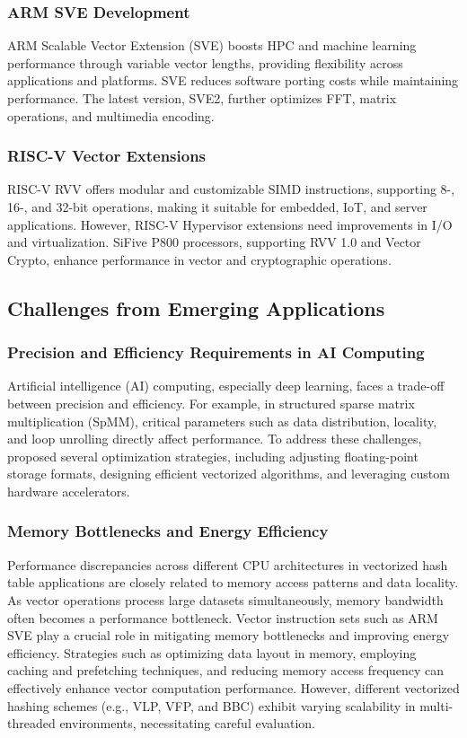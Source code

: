 \documentclass[conference]{IEEEtran}
\begin{document}
\subsubsection{ARM SVE Development\cite{b22}}
ARM Scalable Vector Extension (SVE) boosts HPC and machine learning performance through variable vector lengths, providing flexibility across applications and platforms. SVE reduces software porting costs while maintaining performance. The latest version, SVE2, further optimizes FFT, matrix operations, and multimedia encoding.

\subsubsection{RISC-V Vector Extensions \cite{b17}} RISC-V RVV offers modular and customizable SIMD instructions, supporting 8-, 16-, and 32-bit operations, making it suitable for embedded, IoT, and server applications. However, RISC-V Hypervisor extensions need improvements in I/O and virtualization. SiFive P800 processors, supporting RVV 1.0 and Vector Crypto, enhance performance in vector and cryptographic operations.



\subsection{Challenges from Emerging Applications}
\subsubsection{Precision and Efficiency Requirements in AI Computing \cite{b23}}
Artificial intelligence (AI) computing, especially deep learning, faces a trade-off between precision and efficiency. For example, in structured sparse matrix multiplication (SpMM), critical parameters such as data distribution, locality, and loop unrolling directly affect performance. To address these challenges, \cite{b23} proposed several optimization strategies, including adjusting floating-point storage formats, designing efficient vectorized algorithms, and leveraging custom hardware accelerators.


\subsubsection{Memory Bottlenecks and Energy Efficiency \cite{b24}} 
Performance discrepancies across different CPU architectures in vectorized hash table applications are closely related to memory access patterns and data locality. As vector operations process large datasets simultaneously, memory bandwidth often becomes a performance bottleneck. Vector instruction sets such as ARM SVE play a crucial role in mitigating memory bottlenecks and improving energy efficiency. Strategies such as optimizing data layout in memory, employing caching and prefetching techniques, and reducing memory access frequency can effectively enhance vector computation performance. However, different vectorized hashing schemes (e.g., VLP, VFP, and BBC) exhibit varying scalability in multi-threaded environments, necessitating careful evaluation.
\end{document}
